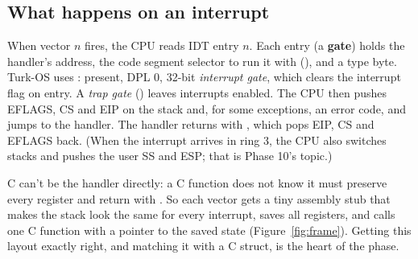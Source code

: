 \documentclass[11pt,a4paper]{article}
\begin{document}
\subsection{What happens on an interrupt}

When vector $n$ fires, the CPU reads IDT entry $n$. Each entry (a \textbf{gate}) holds the handler's address, the
code segment selector to run it with (), and a type byte. Turk-OS uses : present, DPL 0, 32-bit
\emph{interrupt gate}, which clears the interrupt flag on entry. A \emph{trap gate} () leaves interrupts
enabled. The CPU then pushes EFLAGS, CS and EIP on the stack and, for some exceptions, an error code, and jumps to the
handler. The handler returns with , which pops EIP, CS and EFLAGS back. (When the interrupt arrives in ring
3, the CPU also switches stacks and pushes the user SS and ESP; that is Phase 10's topic.)

C can't be the handler directly: a C function does not know it must preserve every register and return with
. So each vector gets a tiny assembly stub that makes the stack look the same for every interrupt,
saves all registers, and calls one C function with a pointer to the saved state (Figure~\ref{fig:frame}). Getting
this layout exactly right, and matching it with a C struct, is the heart of the phase.
\end{document}
